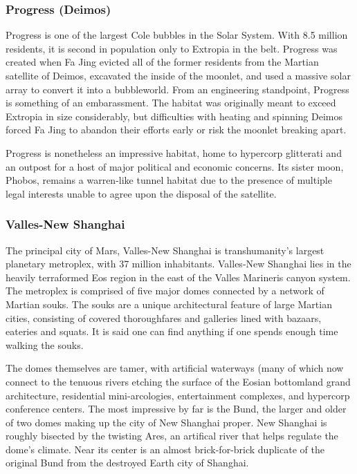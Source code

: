 \subsubsection{Progress (Deimos)}

Progress is one of the largest Cole bubbles in the Solar 
System. With 8.5 million residents, it is second in 
population only to Extropia in the belt. Progress was 
created when Fa Jing evicted all of the former residents 
from the Martian satellite of Deimos, excavated the 
inside of the moonlet, and used a massive solar array 
to convert it into a bubbleworld. From an engineering 
standpoint, Progress is something of an embarassment. 
The habitat was originally meant to exceed Extropia 
in size considerably, but difficulties with heating and 
spinning Deimos forced Fa Jing to abandon their efforts
early or risk the moonlet breaking apart.

Progress is nonetheless an impressive habitat, home 
to hypercorp glitterati and an outpost for a host of 
major political and economic concerns. Its sister 
moon, Phobos, remains a warren-like tunnel habitat 
due to the presence of multiple legal interests unable 
to agree upon the disposal of the satellite.

\subsubsection{Valles-New Shanghai}

The principal city of Mars, Valles-New Shanghai is 
transhumanity's largest planetary metroplex, with 37 
million inhabitants. Valles-New Shanghai lies in the 
heavily terraformed Eos region in the east of the Valles 
Marineris canyon system. The metroplex is comprised 
of five major domes connected by a network of 
Martian souks. The souks are a unique architectural 
feature of large Martian cities, consisting of covered 
thoroughfares and galleries lined with bazaars, eateries
and squats. It is said one can find anything if one
spends enough time walking the souks.

The domes themselves are tamer, with artificial 
waterways (many of which now connect to the tenuous
rivers etching the surface of the Eosian bottomland
grand architecture, residential mini-arcologies,
entertainment complexes, and hypercorp conference 
centers. The most impressive by far is the Bund, the 
larger and older of two domes making up the city 
of New Shanghai proper. New Shanghai is roughly 
bisected by the twisting Ares, an artifical river that 
helps regulate the dome's climate. Near its center is an 
almost brick-for-brick duplicate of the original Bund 
from the destroyed Earth city of Shanghai.

